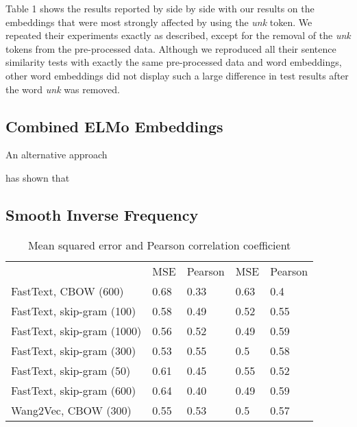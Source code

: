 \documentclass[12pt]{article}
\begin{document}
Table 1 shows the results reported by \cite{hartmann2017portuguese} side by side with our results on the embeddings that were most strongly affected by using the \textit{unk} token. We repeated their experiments exactly as described, except for the removal of the \textit{unk} tokens from the pre-processed data. Although we reproduced all their sentence similarity tests with exactly the same pre-processed data and word embeddings, other word embeddings did not display such a large difference in test results after the word \textit{unk} was removed.

\subsection{Combined ELMo Embeddings}

An alternative approach 


\cite{gehrmann2019improving} has shown that 

\subsection{Smooth Inverse Frequency}


\begin{table}[]
	\centering
	\caption{Mean squared error and Pearson correlation coefficient }
		\begin{tabular}{lllll}
		& MSE & Pearson & MSE & Pearson \\
		FastText, CBOW (600)       & 0.68              & 0.33                  & 0.63                 & 0.4                      \\
		FastText, skip-gram (100)  & 0.58              & 0.49                  & 0.52                 & 0.55                     \\
		FastText, skip-gram (1000) & 0.56              & 0.52                  & 0.49                 & 0.59                     \\
		FastText, skip-gram (300)  & 0.53              & 0.55                  & 0.5                  & 0.58                     \\
		FastText, skip-gram (50)   & 0.61              & 0.45                  & 0.55                 & 0.52                     \\
		FastText, skip-gram (600)  & 0.64              & 0.40                  & 0.49                 & 0.59                     \\
		Wang2Vec, CBOW (300)       & 0.55              & 0.53                  & 0.5                  & 0.57                    
	\end{tabular}
\end{table}


\renewcommand\refname{References}


\end{document}
